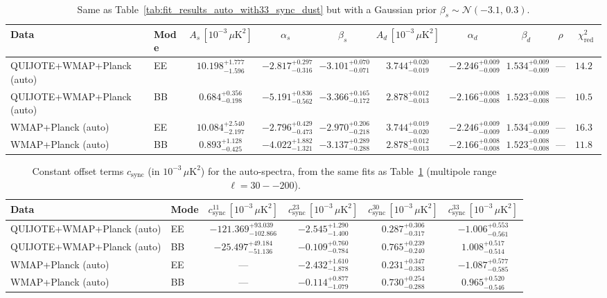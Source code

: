 \begin{table}[h]
\centering
\scriptsize
\setlength{\tabcolsep}{4pt}
\caption{Same as Table~\ref{tab:fit_results_auto_with33_sync_dust} but with a Gaussian prior $\beta_s \sim \mathcal{N}(-3.1,\,0.3)$.}
\label{tab:fit_results_auto_with33_sync_dust_prior_betas}
\begin{tabular}{llcccccccc}
\toprule
Data & Mode & $A_s\,[10^{-3}\,\mu\mathrm{K}^2]$ & $\alpha_s$ & $\beta_s$ & $A_d\,[10^{-3}\,\mu\mathrm{K}^2]$ & $\alpha_d$ & $\beta_d$ & $\rho$ & $\chi^2_\mathrm{red}$ \\
\midrule
QUIJOTE+WMAP+Planck (auto) & EE & $10.198^{+1.777}_{-1.596}$ & $-2.817^{+0.297}_{-0.316}$ & $-3.101^{+0.070}_{-0.071}$ & $3.744^{+0.020}_{-0.019}$ & $-2.246^{+0.009}_{-0.009}$ & $1.534^{+0.009}_{-0.009}$ & --- & $14.29$ \\
QUIJOTE+WMAP+Planck (auto) & BB & $0.684^{+0.356}_{-0.198}$ & $-5.191^{+0.836}_{-0.562}$ & $-3.366^{+0.165}_{-0.172}$ & $2.878^{+0.012}_{-0.013}$ & $-2.166^{+0.008}_{-0.008}$ & $1.523^{+0.008}_{-0.008}$ & --- & $10.54$ \\
WMAP+Planck (auto) & EE & $10.084^{+2.540}_{-2.197}$ & $-2.796^{+0.429}_{-0.473}$ & $-2.970^{+0.206}_{-0.218}$ & $3.744^{+0.019}_{-0.020}$ & $-2.246^{+0.009}_{-0.009}$ & $1.534^{+0.009}_{-0.009}$ & --- & $16.39$ \\
WMAP+Planck (auto) & BB & $0.893^{+1.128}_{-0.425}$ & $-4.022^{+1.882}_{-1.321}$ & $-3.137^{+0.289}_{-0.288}$ & $2.878^{+0.012}_{-0.013}$ & $-2.166^{+0.008}_{-0.008}$ & $1.523^{+0.008}_{-0.008}$ & --- & $11.88$ \\
\bottomrule
\end{tabular}
\end{table}

\begin{table}[h]
\centering
\scriptsize
\setlength{\tabcolsep}{4pt}
\caption{Constant offset terms $c_{\mathrm{sync}}$ (in $10^{-3}\,\mu\mathrm{K}^2$) for the auto-spectra, from the same fits as Table~\ref{tab:fit_results_auto_with33_sync_dust_prior_betas} (multipole range $\ell=30--200$).}
\label{tab:fit_results_auto_with33_sync_dust_prior_betas_c_terms}
\begin{tabular}{llcccc}
\toprule
Data & Mode & $c_{\mathrm{sync}}^{11}\,[10^{-3}\,\mu\mathrm{K}^2]$ & $c_{\mathrm{sync}}^{23}\,[10^{-3}\,\mu\mathrm{K}^2]$ & $c_{\mathrm{sync}}^{30}\,[10^{-3}\,\mu\mathrm{K}^2]$ & $c_{\mathrm{sync}}^{33}\,[10^{-3}\,\mu\mathrm{K}^2]$ \\
\midrule
QUIJOTE+WMAP+Planck (auto) & EE & $-121.369^{+93.039}_{-102.866}$ & $-2.545^{+1.290}_{-1.400}$ & $0.287^{+0.306}_{-0.317}$ & $-1.006^{+0.553}_{-0.561}$ \\
QUIJOTE+WMAP+Planck (auto) & BB & $-25.497^{+49.184}_{-51.136}$ & $-0.109^{+0.760}_{-0.784}$ & $0.765^{+0.239}_{-0.240}$ & $1.008^{+0.517}_{-0.514}$ \\
WMAP+Planck (auto) & EE & --- & $-2.432^{+1.610}_{-1.878}$ & $0.231^{+0.347}_{-0.383}$ & $-1.087^{+0.577}_{-0.585}$ \\
WMAP+Planck (auto) & BB & --- & $-0.114^{+0.877}_{-1.079}$ & $0.730^{+0.254}_{-0.288}$ & $0.965^{+0.520}_{-0.546}$ \\
\bottomrule
\end{tabular}
\end{table}
